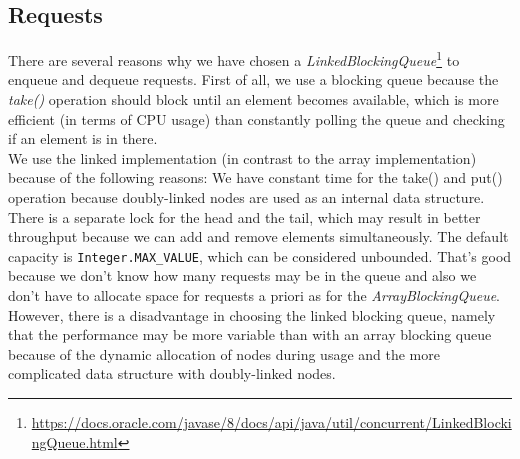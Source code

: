 \subsection{Requests}
There are several reasons why we have chosen a \textit{LinkedBlockingQueue}\footnote{\url{https://docs.oracle.com/javase/8/docs/api/java/util/concurrent/LinkedBlockingQueue.html}} to enqueue and dequeue requests. First of all, we use a blocking queue because the \textit{take()} operation should block until an element becomes available, which is more efficient (in terms of CPU usage) than constantly polling the queue and checking if an element is in there. \\
We use the linked implementation (in contrast to the array implementation) because of the following reasons: We have constant time for the take() and put() operation because doubly-linked nodes are used as an internal data structure. There is a separate lock for the head and the tail, which may result in better throughput because we can add and remove elements simultaneously. The default capacity is \texttt{Integer.MAX_VALUE}, which can be considered unbounded. That's good because we don't know how many requests may be in the queue and also we don't have to allocate space for requests a priori as for the \textit{ArrayBlockingQueue}. \\
However, there is a disadvantage in choosing the linked blocking queue, namely that the performance may be more variable than with an array blocking queue because of the dynamic allocation of nodes during usage and the more complicated data structure with doubly-linked nodes. \\

